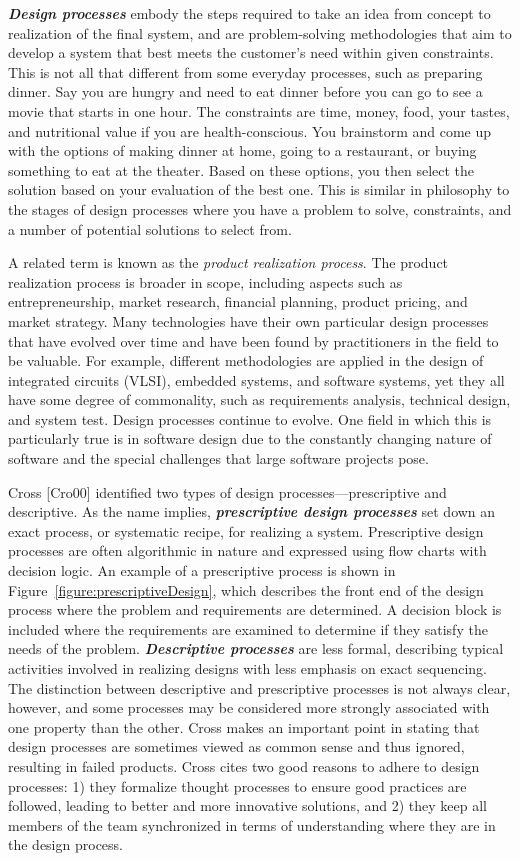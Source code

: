 \emph{\textbf{Design processes}} embody the steps required to take an
idea from concept to realization of the final system, and are
problem-solving methodologies that aim to develop a system that best
meets the customer's need within given constraints. This is not all that
different from some everyday processes, such as preparing dinner. Say
you are hungry and need to eat dinner before you can go to see a movie
that starts in one hour. The constraints are time, money, food, your
tastes, and nutritional value if you are health-conscious. You
brainstorm and come up with the options of making dinner at home, going
to a restaurant, or buying something to eat at the theater. Based on
these options, you then select the solution based on your evaluation of
the best one. This is similar in philosophy to the stages of design
processes where you have a problem to solve, constraints, and a number
of potential solutions to select from.

A related term is known as the \emph{product realization process}. The
product realization process is broader in scope, including aspects such
as entrepreneurship, market research, financial planning, product
pricing, and market strategy. Many technologies have their own
particular design processes that have evolved over time and have been
found by practitioners in the field to be valuable. For example,
different methodologies are applied in the design of integrated circuits
(VLSI), embedded systems, and software systems, yet they all have some
degree of commonality, such as requirements analysis, technical design,
and system test. Design processes continue to evolve. One field in which
this is particularly true is in software design due to the constantly
changing nature of software and the special challenges that large
software projects pose.

Cross {[}Cro00{]} identified two types of design
processes---prescriptive and descriptive. As the name implies,
\emph{\textbf{prescriptive design processes}} set down an exact process,
or systematic recipe, for realizing a system. Prescriptive design
processes are often algorithmic in nature and expressed using flow
charts with decision logic. An example of a prescriptive process is
shown in Figure~\ref{figure:prescriptiveDesign}, 
which describes the front end of the design process
where the problem and requirements are determined. A decision block is
included where the requirements are examined to determine if they
satisfy the needs of the problem. \emph{\textbf{Descriptive processes}}
are less formal, describing typical activities involved in realizing
designs with less emphasis on exact sequencing. The distinction between
descriptive and prescriptive processes is not always clear, however, and
some processes may be considered more strongly associated with one
property than the other. Cross makes an important point in stating that
design processes are sometimes viewed as common sense and thus ignored,
resulting in failed products. Cross cites two good reasons to adhere to
design processes: 1) they formalize thought processes to ensure good
practices are followed, leading to better and more innovative solutions,
and 2) they keep all members of the team synchronized in terms of
understanding where they are in the design process.

